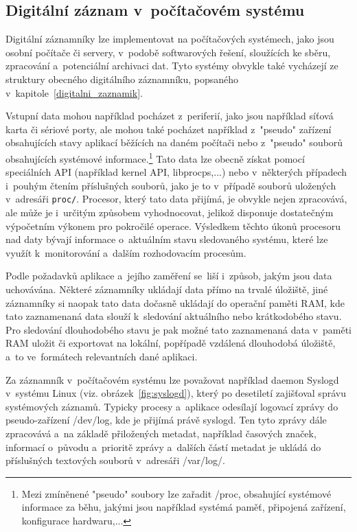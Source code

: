 \newpage

\subsection{Digitální záznam v~počítačovém systému}
Digitální záznamníky lze implementovat na počítačových systémech, jako jsou osobní počítače či servery, v~podobě softwarových řešení, sloužících ke sběru, zpracování a~potenciální archivaci dat. Tyto systémy obvykle také vycházejí ze struktury obecného digitálního záznamníku, popsaného v~kapitole~\ref{digitalni_zaznamik}. 

Vstupní data mohou například pocházet z~periferií, jako jsou například síťová karta či sériové porty, ale mohou také pocházet například z~"pseudo" zařízení obsahujících stavy aplikací běžících na daném počítači nebo z~"pseudo" souborů obsahujících systémové informace.\footnote{Mezi zmíněnené "pseudo" soubory lze zařadit /proc, obsahující systémové informace za běhu, jakými jsou například systémá paměť, připojená zařízení, konfigurace hardwaru,...} Tato data lze obecně získat pomocí speciálních API (například kernel API, libprocps,...) nebo v~některých případech i~pouhým čtením příslušných souborů, jako je to v~případě souborů uložených v~adresáři \texttt{proc/}. Procesor, který tato data přijímá, je obvykle nejen zpracovává, ale může je i~určitým způsobem vyhodnocovat, jelikož disponuje dostatečným výpočetním výkonem pro pokročilé operace. Výsledkem těchto úkonů procesoru nad daty bývají informace o~aktuálním stavu sledovaného systému, které lze využít k~monitorování a~dalším rozhodovacím procesům.~\cite{linux_libprocsp, linux_in_action_log_and_monitoring}

% 
Podle požadavků aplikace a~jejího zaměření se~liší i~způsob, jakým jsou data uchovávána. Některé záznamníky ukládají data přímo na trvalé úložiště, jiné záznamníky si naopak tato data dočasně ukládají do operační paměti RAM, kde tato zaznamenaná data slouží k~sledování aktuálního nebo krátkodobého stavu. Pro sledování dlouhodobého stavu je pak možné tato zaznamenaná data v~paměti RAM uložit či exportovat na lokální, popřípadě vzdálená dlouhodobá úložiště, a~to ve~formátech relevantních dané aplikaci.~\cite{labview, serial_datalogger_timestamping, linux_in_action_log_and_monitoring}

Za záznamník v~počítačovém systému lze považovat například daemon Syslogd v~systému Linux (viz. obrázek~\ref{fig:syslogd}), který po desetiletí zajišťoval správu systémových záznamů. Typicky procesy a~aplikace odesílají logovací zprávy do pseudo-zařízení /dev/log, kde je přijímá právě syslogd. Ten tyto zprávy dále zpracovává a~na základě přiložených metadat, například časových značek, informací o~původu a~prioritě zprávy a~dalších částí metadat je ukládá do příslušných textových souborů v~adresáři /var/log/.~\cite{linux_in_action_log_and_monitoring}

